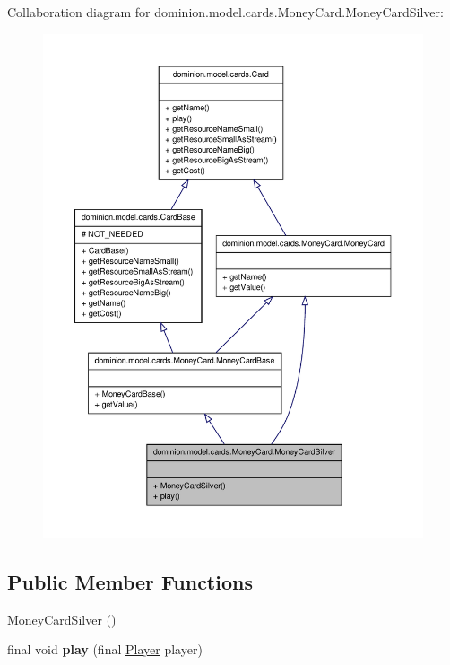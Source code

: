 \-Collaboration diagram for dominion.\-model.\-cards.\-Money\-Card.\-Money\-Card\-Silver\-:
\nopagebreak
\begin{figure}[H]
\begin{center}
\leavevmode
\includegraphics[width=350pt]{classdominion_1_1model_1_1cards_1_1MoneyCard_1_1MoneyCardSilver__coll__graph}
\end{center}
\end{figure}
\subsection*{\-Public \-Member \-Functions}
\begin{DoxyCompactItemize}
\item 
\hyperlink{classdominion_1_1model_1_1cards_1_1MoneyCard_1_1MoneyCardSilver_a9f45019e63d1a527f97fba62238feff1}{\-Money\-Card\-Silver} ()
\item 
\hypertarget{classdominion_1_1model_1_1cards_1_1MoneyCard_1_1MoneyCardSilver_a7cbac793b17c074275de7e25e50c269e}{final void {\bfseries play} (final \hyperlink{interfacedominion_1_1model_1_1Player}{\-Player} player)}\label{classdominion_1_1model_1_1cards_1_1MoneyCard_1_1MoneyCardSilver_a7cbac793b17c074275de7e25e50c269e}

\end{DoxyCompactItemize}


